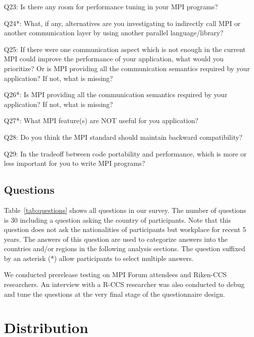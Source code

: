 \documentclass[submit,techrep,noauthor,english]{ipsj}
\begin{document}
\begin{table}
\begin{description}
\item{Q23:} Is there any room for performance tuning in your MPI
  programs? 
\item{Q24*:} What, if any, alternatives are you investigating to
  indirectly call MPI or another communication layer by using another
  parallel language/library? 
\item{Q25:} If there were one communication aspect which is not enough
  in the current MPI could improve the performance of your
  application, what would you prioritize? Or is MPI providing all the
  communication semantics required by your application? If not, what
  is missing? 
\item{Q26*:} Is MPI providing all the communication semantics required
  by your application? If not, what is missing? 
\item{Q27*:} What MPI feature(s) are NOT useful for you application? 
\item{Q28:} Do you think the MPI standard should maintain backward
  compatibility? 
\item{Q29:} In the tradeoff between code portability and performance,
  which is more or less important for you to write MPI programs? 
\end{description}
\end{table}

\subsection{Questions}

Table~\ref{tab:questions} shows all questions in our survey. The
number of questions is 30 including a question asking the country of
participants. Note that this question does not ask the nationalities
of participants but workplace for recent 5 years. The answers of this
question are used to categorize answers into the countries and/or
regions in the following analysis sections. The question suffixed by
an asterisk (*) allow participants to select multiple answers. 

We conducted prerelease testing on MPI Forum\cite{mpi-forum} attendees
and Riken-CCS researchers. An interview with a R-CCS
researcher was also conducted to debug and tune the questions at the
very final stage of the questionnaire design.

\section{Distribution}
\end{document}
